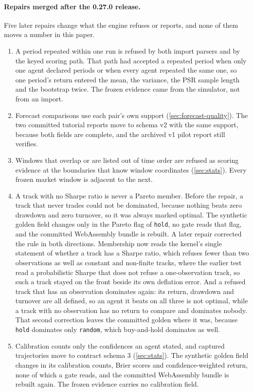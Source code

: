 \paragraph{Repairs merged after the 0.27.0 release.} Five later repairs change what the engine refuses or reports, and none of them moves a number in this paper.
\begin{enumerate}[leftmargin=*,itemsep=1pt]
\item A period repeated within one run is refused by both import parsers and by the keyed scoring path. That path had accepted a repeated period when only one agent declared periods or when every agent repeated the same one, so one period's return entered the mean, the variance, the PSR sample length and the bootstrap twice. The frozen evidence came from the simulator, not from an import.
\item Forecast comparisons use each pair's own support (\cref{sec:forecast-quality}). The two committed tutorial reports move to schema v2 with the same support, because both fields are complete, and the archived v1 pilot report still verifies.
\item Windows that overlap or are listed out of time order are refused as scoring evidence at the boundaries that know window coordinates (\cref{sec:stats}). Every frozen market window is adjacent to the next.
\item A track with no Sharpe ratio is never a Pareto member. Before the repair, a track that never trades could not be dominated, because nothing beats zero drawdown and zero turnover, so it was always marked optimal. The synthetic golden field changes only in the Pareto flag of \texttt{hold}, no gate reads that flag, and the committed WebAssembly bundle is rebuilt. A later repair corrected the rule in both directions. Membership now reads the kernel's single statement of whether a track has a Sharpe ratio, which refuses fewer than two observations as well as constant and non-finite tracks, where the earlier test read a probabilistic Sharpe that does not refuse a one-observation track, so such a track stayed on the front beside its own deflation error. And a refused track that has an observation dominates again: its return, drawdown and turnover are all defined, so an agent it beats on all three is not optimal, while a track with no observation has no return to compare and dominates nobody. That second correction leaves the committed golden where it was, because \texttt{hold} dominates only \texttt{random}, which buy-and-hold dominates as well.
\item Calibration counts only the confidences an agent stated, and captured trajectories move to contract schema 3 (\cref{sec:stats}). The synthetic golden field changes in its calibration counts, Brier scores and confidence-weighted return, none of which a gate reads, and the committed WebAssembly bundle is rebuilt again. The frozen evidence carries no calibration field.
\end{enumerate}

